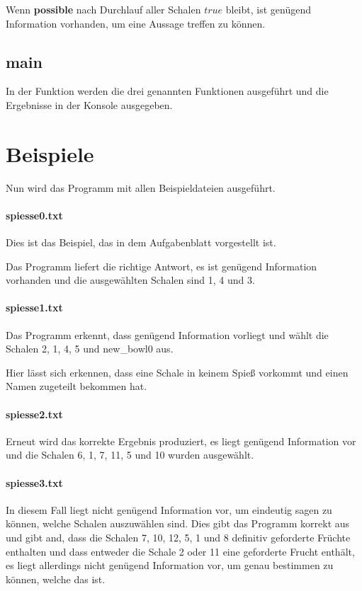\documentclass[a4paper,10pt,ngerman]{scrartcl}
\begin{document}
Wenn \textbf{possible} nach Durchlauf aller Schalen $true$ bleibt, ist genügend Information vorhanden, um eine Aussage treffen zu können.

\subsection{\textbf{main}}
In der  Funktion werden die drei genannten Funktionen ausgeführt und die Ergebnisse in der Konsole ausgegeben.

\section{Beispiele}
Nun wird das Programm mit allen Beispieldateien ausgeführt.

\paragraph{spiesse0.txt}
Dies ist das Beispiel, das in dem Aufgabenblatt vorgestellt ist.

Das Programm liefert die richtige Antwort, es ist genügend Information vorhanden und die ausgewählten Schalen sind 1, 4 und 3.

\paragraph{spiesse1.txt}
Das Programm erkennt, dass genügend Information vorliegt und wählt die Schalen 2, 1, 4, 5 und new\_bowl0 aus.

Hier lässt sich erkennen, dass eine Schale in keinem Spieß vorkommt und einen Namen zugeteilt bekommen hat.

\paragraph{spiesse2.txt}
Erneut wird das korrekte Ergebnis produziert, es liegt genügend Information vor und die Schalen 6, 1, 7, 11, 5 und 10 wurden ausgewählt.

\paragraph{spiesse3.txt}
In diesem Fall liegt nicht genügend Information vor, um eindeutig sagen zu können, welche Schalen auszuwählen sind.
Dies gibt das Programm korrekt aus und gibt and, dass die Schalen 7, 10, 12, 5, 1 und 8 definitiv geforderte Früchte enthalten und dass entweder die Schale 2 oder 11 eine geforderte Frucht enthält, es liegt allerdings nicht genügend Information vor, um genau bestimmen zu können, welche das ist.
\end{document}
